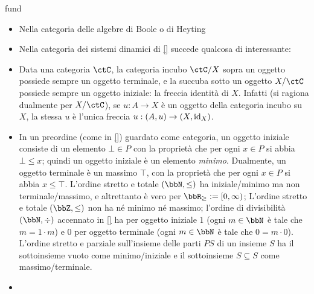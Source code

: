 \begin{hExamples}{fund}
\begin{itemize}
		\item Nella categoria delle algebre di Boole o di Heyting \Todo{}
		\item Nella categoria dei sistemi dinamici di \ref{} succede qualcosa di interessante: \Todo{}
		\item Data una categoria \(\ctC\), la categoria incubo \(\ctC/X\) sopra un oggetto possiede sempre un oggetto terminale, e la succuba sotto un oggetto \(X/\ctC\) possiede sempre un oggetto iniziale: la freccia identità di \(X\). Infatti (si ragiona dualmente per \(X/\ctC\)), se \(u : A \to X\) è un oggetto della categoria incubo su \(X\), la stessa \(u\) è l'unica freccia \(u : (A,u) \to (X,\mathrm{id}_X)\).
		\item In un preordine (come in \ref{}) guardato come categoria, un oggetto iniziale consiste di un elemento \(\bot\in P\) con la proprietà che per ogni \(x\in P\) si abbia \(\bot\le x\); quindi un oggetto iniziale è un elemento \emph{minimo}. Dualmente, un oggetto terminale è un massimo \(\top\), con la proprietà che per ogni \(x\in P\) si abbia \(x\le \top\). L'ordine stretto e totale \((\bbN,\le)\) ha iniziale/minimo ma non terminale/massimo, e altrettanto è vero per \(\bbR_\ge := [0,\infty)\); L'ordine stretto e totale \((\bbZ,\le)\) non ha né minimo né massimo; l'ordine di divisibilità \((\bbN,\div)\) accennato in \ref{} ha per oggetto iniziale \(1\) (ogni \(m\in\bbN\) è tale che \(m = 1\cdot m\)) e \(0\) per oggetto terminale (ogni \(m\in\bbN\) è tale che \(0 = m\cdot 0\)). L'ordine stretto e parziale sull'insieme delle parti \(PS\) di un insieme \(S\) ha il sottoinsieme vuoto come minimo/iniziale e il sottoinsieme \(S\subseteq S\) come massimo/terminale.
		\item
	\end{itemize}
\end{hExamples}

